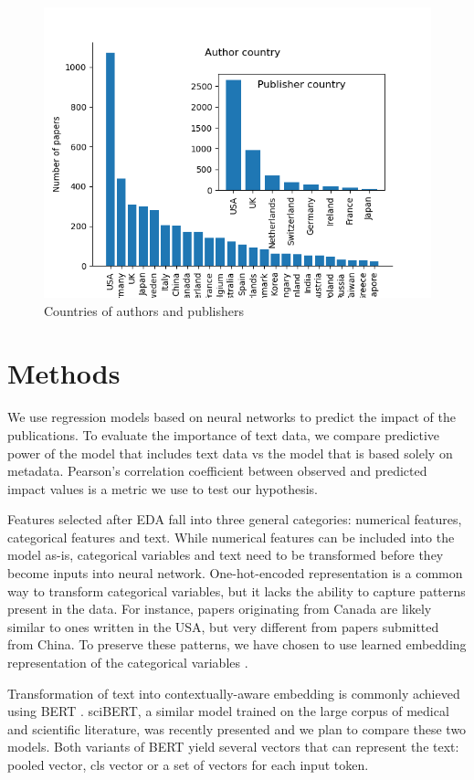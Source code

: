 \documentclass[11pt]{article}
\begin{document}
\begin{figure}
	\includegraphics[width= \columnwidth]{./Images/Countries.png}
	\caption{Countries of authors and publishers}
	\label{fig:countries}
\end{figure}

\section{Methods}
We use regression models based on neural networks to predict the impact of the publications. To evaluate the importance of text data, we compare predictive power of the model that includes text data vs the model that is based solely on metadata. Pearson's correlation coefficient between observed and predicted impact values is a metric we use to test our hypothesis. 

Features selected after EDA fall into three general categories: numerical features, categorical features and text. While numerical features can be included into the model as-is, categorical variables and text need to be transformed before they become inputs into neural network. One-hot-encoded representation is a common way to transform categorical variables, but it lacks the ability to capture patterns present in the data. For instance, papers originating from Canada are likely similar to ones written in the USA, but very different from papers submitted from China. To preserve these patterns, we have chosen to use learned embedding representation of the categorical variables \citep{DBLP:journals/corr/GuoB16}.

Transformation of text into contextually-aware embedding is commonly achieved using BERT \citep{DBLP:journals/corr/abs-1810-04805}. sciBERT, a similar model trained on the large corpus of medical and scientific literature, was recently presented \citep{DBLP:journals/corr/abs-1903-10676} and we plan to compare these two models. Both variants of BERT yield several vectors that can represent the text: pooled vector, cls vector or a set of vectors for each input token. 
\end{document}
